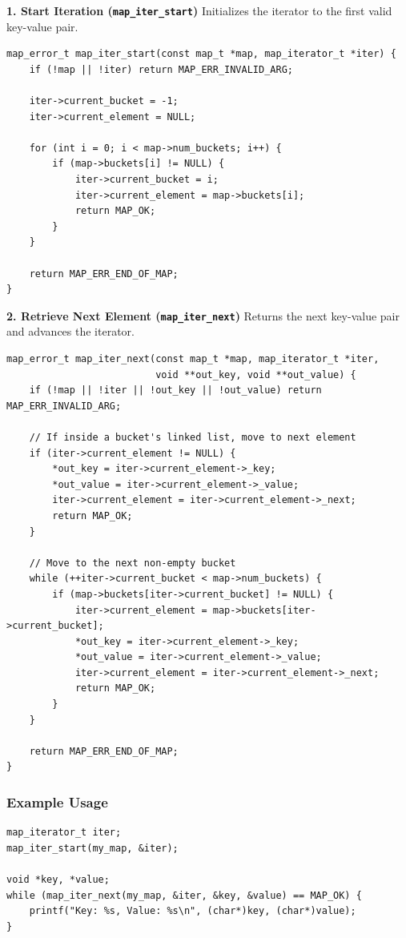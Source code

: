 \documentclass[titlepage]{article}
\begin{document}
\textbf{1. Start Iteration (\texttt{map\_iter\_start})}
Initializes the iterator to the first valid key-value pair.

\begin{verbatim}
map_error_t map_iter_start(const map_t *map, map_iterator_t *iter) {
    if (!map || !iter) return MAP_ERR_INVALID_ARG;

    iter->current_bucket = -1;
    iter->current_element = NULL;

    for (int i = 0; i < map->num_buckets; i++) {
        if (map->buckets[i] != NULL) {
            iter->current_bucket = i;
            iter->current_element = map->buckets[i];
            return MAP_OK;
        }
    }

    return MAP_ERR_END_OF_MAP;
}
\end{verbatim}

\textbf{2. Retrieve Next Element (\texttt{map\_iter\_next})}
Returns the next key-value pair and advances the iterator.

\begin{verbatim}
map_error_t map_iter_next(const map_t *map, map_iterator_t *iter,
                          void **out_key, void **out_value) {
    if (!map || !iter || !out_key || !out_value) return MAP_ERR_INVALID_ARG;

    // If inside a bucket's linked list, move to next element
    if (iter->current_element != NULL) {
        *out_key = iter->current_element->_key;
        *out_value = iter->current_element->_value;
        iter->current_element = iter->current_element->_next;
        return MAP_OK;
    }

    // Move to the next non-empty bucket
    while (++iter->current_bucket < map->num_buckets) {
        if (map->buckets[iter->current_bucket] != NULL) {
            iter->current_element = map->buckets[iter->current_bucket];
            *out_key = iter->current_element->_key;
            *out_value = iter->current_element->_value;
            iter->current_element = iter->current_element->_next;
            return MAP_OK;
        }
    }

    return MAP_ERR_END_OF_MAP;
}
\end{verbatim}

\subsubsection{Example Usage}
\begin{verbatim}
map_iterator_t iter;
map_iter_start(my_map, &iter);

void *key, *value;
while (map_iter_next(my_map, &iter, &key, &value) == MAP_OK) {
    printf("Key: %s, Value: %s\n", (char*)key, (char*)value);
}
\end{verbatim}
\end{document}
